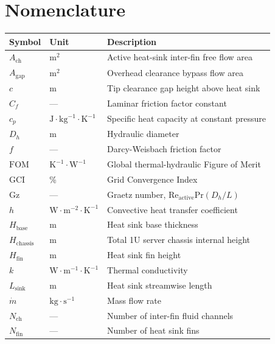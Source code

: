 \documentclass[preprint,12pt]{elsarticle}
\begin{document}




\section*{Nomenclature}
\begin{longtable}{llp{}}
\hline
\textbf{Symbol} & \textbf{Unit} & \textbf{Description} \\
\hline
$A_{\mathrm{ch}}$ & $\mathrm{m}^2$ & Active heat-sink inter-fin free flow area \\
$A_{\mathrm{gap}}$ & $\mathrm{m}^2$ & Overhead clearance bypass flow area \\
$c$ & $\mathrm{m}$ & Tip clearance gap height above heat sink \\
$C_f$ & --- & Laminar friction factor constant \\
$c_p$ & $\mathrm{J}\cdot\mathrm{kg}^{-1}\cdot\mathrm{K}^{-1}$ & Specific heat capacity at constant pressure \\
$D_h$ & $\mathrm{m}$ & Hydraulic diameter \\
$f$ & --- & Darcy-Weisbach friction factor \\
$\mathrm{FOM}$ & $\mathrm{K}^{-1}\cdot\mathrm{W}^{-1}$ & Global thermal-hydraulic Figure of Merit \\
$\mathrm{GCI}$ & \% & Grid Convergence Index \\
$\mathrm{Gz}$ & --- & Graetz number, $\mathrm{Re}_{\mathrm{active}}\mathrm{Pr}(D_h/L)$ \\
$h$ & $\mathrm{W}\cdot\mathrm{m}^{-2}\cdot\mathrm{K}^{-1}$ & Convective heat transfer coefficient \\
$H_{\mathrm{base}}$ & $\mathrm{m}$ & Heat sink base thickness \\
$H_{\mathrm{chassis}}$ & $\mathrm{m}$ & Total 1U server chassis internal height \\
$H_{\mathrm{fin}}$ & $\mathrm{m}$ & Heat sink fin height \\
$k$ & $\mathrm{W}\cdot\mathrm{m}^{-1}\cdot\mathrm{K}^{-1}$ & Thermal conductivity \\
$L_{\mathrm{sink}}$ & $\mathrm{m}$ & Heat sink streamwise length \\
$\dot{m}$ & $\mathrm{kg}\cdot\mathrm{s}^{-1}$ & Mass flow rate \\
$N_{\mathrm{ch}}$ & --- & Number of inter-fin fluid channels \\
$N_{\mathrm{fin}}$ & --- & Number of heat sink fins \\

\end{longtable}
\end{document}
